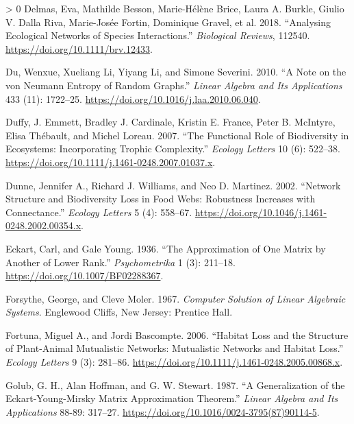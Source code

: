 \documentclass[10pt,oneside]{article}
\newlength{\cslhangindent}
\newenvironment{CSLReferences}[3] %
 {%
  \setlength{\parindent}{0pt}
  \ifodd #1 \everypar{\setlength{\hangindent}{\cslhangindent}}\ignorespaces\fi
  \ifnum #2 > 0
  \setlength{\parskip}{#2\baselineskip}
  \fi
 }%
 {}
\begin{document}
\begin{CSLReferences}{1}{0}
\leavevmode\hypertarget{ref-Delmas2018AnaEco}{}%
Delmas, Eva, Mathilde Besson, Marie-Hélène Brice, Laura A. Burkle,
Giulio V. Dalla Riva, Marie-Josée Fortin, Dominique Gravel, et al. 2018.
{``Analysing Ecological Networks of Species Interactions.''}
\emph{Biological Reviews}, 112540.
\url{https://doi.org/10.1111/brv.12433}.

\leavevmode\hypertarget{ref-Du2010NotNeu}{}%
Du, Wenxue, Xueliang Li, Yiyang Li, and Simone Severini. 2010. {``A Note
on the von Neumann Entropy of Random Graphs.''} \emph{Linear Algebra and
Its Applications} 433 (11): 1722--25.
\url{https://doi.org/10.1016/j.laa.2010.06.040}.

\leavevmode\hypertarget{ref-Duffy2007FunRol}{}%
Duffy, J. Emmett, Bradley J. Cardinale, Kristin E. France, Peter B.
McIntyre, Elisa Thébault, and Michel Loreau. 2007. {``The Functional
Role of Biodiversity in Ecosystems: Incorporating Trophic Complexity.''}
\emph{Ecology Letters} 10 (6): 522--38.
\url{https://doi.org/10.1111/j.1461-0248.2007.01037.x}.

\leavevmode\hypertarget{ref-Dunne2002NetStr}{}%
Dunne, Jennifer A., Richard J. Williams, and Neo D. Martinez. 2002.
{``Network Structure and Biodiversity Loss in Food Webs: Robustness
Increases with Connectance.''} \emph{Ecology Letters} 5 (4): 558--67.
\url{https://doi.org/10.1046/j.1461-0248.2002.00354.x}.

\leavevmode\hypertarget{ref-Eckart1936AppOne}{}%
Eckart, Carl, and Gale Young. 1936. {``The Approximation of One Matrix
by Another of Lower Rank.''} \emph{Psychometrika} 1 (3): 211--18.
\url{https://doi.org/10.1007/BF02288367}.

\leavevmode\hypertarget{ref-Forsythe1967ComSol}{}%
Forsythe, George, and Cleve Moler. 1967. \emph{Computer Solution of
Linear Algebraic Systems}. Englewood Cliffs, New Jersey: Prentice Hall.

\leavevmode\hypertarget{ref-Fortuna2006HabLos}{}%
Fortuna, Miguel A., and Jordi Bascompte. 2006. {``Habitat Loss and the
Structure of Plant-Animal Mutualistic Networks: Mutualistic Networks and
Habitat Loss.''} \emph{Ecology Letters} 9 (3): 281--86.
\url{https://doi.org/10.1111/j.1461-0248.2005.00868.x}.

\leavevmode\hypertarget{ref-Golub1987GenEck}{}%
Golub, G. H., Alan Hoffman, and G. W. Stewart. 1987. {``A Generalization
of the Eckart-Young-Mirsky Matrix Approximation Theorem.''} \emph{Linear
Algebra and Its Applications} 88-89: 317--27.
\url{https://doi.org/10.1016/0024-3795(87)90114-5}.


\end{CSLReferences}
\end{document}
